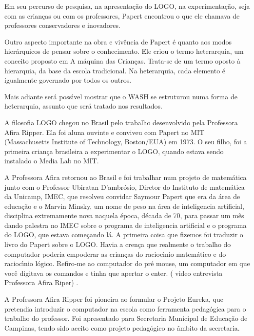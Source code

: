 \documentclass[
12pt,		%
openright,	%
twoside,  %
a4paper,			%
chapter=TITLE,		%
english,			%
french,				%
spanish,			%
brazil				%
]{USPSC-classe/USPSC}
\begin{document}
Em seu percurso de pesquisa, na apresenta\c{c}\~ao do LOGO, na experimenta\c{c}\~ao, seja com as crian\c{c}as ou com os professores, Papert encontrou o que ele chamava de \textquotedbl professores conservadores e  inovadores\textquotedbl  [XXX].


Outro aspecto importante na obra e viv\^encia de Papert \'e quanto aos modos hier\'arquicos de pensar sobre o conhecimento.  Ele criou o termo  \textquotedbl heterarquia\textquotedbl , um conceito proposto em  \textquotedbl A m\'aquina das Crian\c{c}as\textquotedbl . Trata-se de  um termo oposto \`a hierarquia, da base da escola tradicional. Na heterarquia, cada elemento \'e igualmente governado por todos os outros.


Mais adiante ser\'a poss\'{\i}vel mostrar que o WASH se estruturou numa forma de heterarquia, assunto que ser\'a tratado nos resultados.


A filosofia LOGO chegou no Brasil pelo trabalho  desenvolvido pela Professora Afira Ripper. Ela foi aluna ouvinte e conviveu com Papert no MIT (Massachusetts Institute of Technology, Boston/EUA) em 1973. O seu filho, foi a primeira crian\c{c}a brasileira a experimentar o LOGO, quando estava sendo instalado o Media Lab no MIT.\textquotedbl 


A Professora Afira  retornou ao  Brasil e foi trabalhar num  projeto de matem\'atica junto com o Professor  Ubiratan D’ambr\'osio, Diretor do  Instituto de matem\'atica da Unicamp, IMEC, que resolveu convidar Saymour Papert que era da \'area de educa\c{c}\~ao e o Marvin Minsky,  um nome de peso na \'area de inteligencia artificial, disciplina extremamente nova naquela \'epoca, d\'ecada de 70, para passar um m\^es dando palestra  no IMEC sobre o programa de inteligencia artificial e o programa do LOGO, que estava come\c{c}ando l\'a.  A primeira coisa que fizemos foi traduzir o livro do Papert sobre o LOGO.  Havia a cren\c{c}a que realmente o trabalho do computador  poderia empoderar as crian\c{c}as do racioc\'{\i}nio matem\'atico e do racioc\'{\i}nio l\'ogico. Refiro-me ao computador do pr\'e mouse, um computador  em que voc\^e digitava os comandos e tinha que apertar o enter. ( video entrevista Professora Afira Riper) .\textquotedbl 


A Professora Afira Ripper foi pioneira ao formular o Projeto Eureka, que pretendia introduzir o computador na escola como ferramenta pedag\'ogica para o trabalho do professor. Foi apresentado para  Secretaria Municipal de Educa\c{c}\~ao de Campinas, tendo sido aceito como projeto pedag\'ogico no \^ambito da secretaria.
\end{document}
